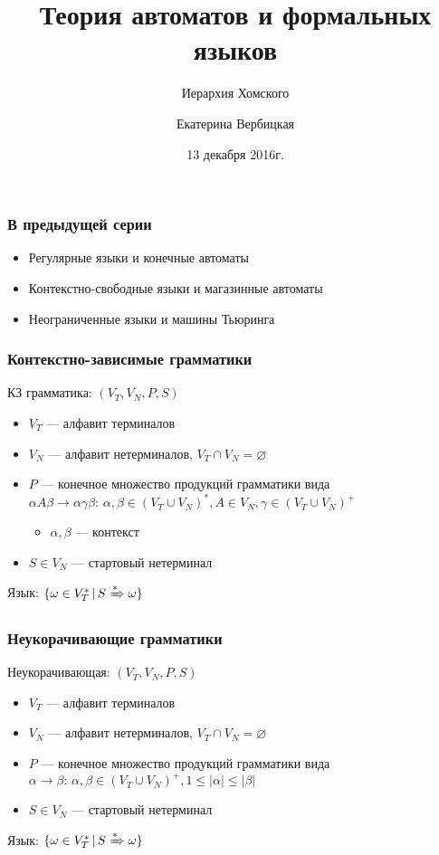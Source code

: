 \documentclass{beamer}
\title[]{Теория автоматов и формальных языков}
\subtitle[]{Иерархия Хомского}
\institute[]{
Санкт-Петербургский государственный электротехнический университет <<ЛЭТИ>>\\
}
\author[]{Екатерина Вербицкая}
\date{13 декабря 2016г.}
\newcommand{\derive}[0]{\xRightarrow[]{*}}
\begin{document}
{
  \begin{frame}
    \titlepage
  \end{frame}
}

\begin{frame}[fragile]
  \transwipe[direction=90]
  \frametitle{В предыдущей серии}
  \begin{itemize}
    \item Регулярные языки и конечные автоматы
    \item Контекстно-свободные языки и магазинные автоматы
    \item Неограниченные языки и машины Тьюринга
  \end{itemize}
\end{frame}

\begin{frame}[fragile]
  \transwipe[direction=90]
  \frametitle{Контекстно-зависимые грамматики}
  КЗ грамматика: $(V_T, V_N, P, S)$
  
  \begin{itemize}
    \item $V_T$ --- алфавит терминалов
    \item $V_N$ --- алфавит нетерминалов, $V_T \cap V_N = \varnothing$
    \item $P$ --- конечное множество продукций грамматики вида $\alpha A \beta \rightarrow \alpha \gamma \beta: \, \alpha, \beta \in (V_T \cup V_N)^*, A \in V_N, \gamma \in (V_T \cup V_N)^+$
    \begin{itemize}
      \item $\alpha, \beta$ --- контекст
    \end{itemize}    
    \item $S \in V_N$ --- стартовый нетерминал
  \end{itemize} 
  
  Язык: $\{ \omega \in V_T^* \, | \, S \derive \omega\}$ 
\end{frame}


\begin{frame}[fragile]
  \transwipe[direction=90]
  \frametitle{Неукорачивающие грамматики}
  Неукорачивающая: $(V_T, V_N, P, S)$
  
  \begin{itemize}
    \item $V_T$ --- алфавит терминалов
    \item $V_N$ --- алфавит нетерминалов, $V_T \cap V_N = \varnothing$
    \item $P$ --- конечное множество продукций грамматики вида $\alpha \rightarrow \beta: \, \alpha, \beta \in (V_T \cup V_N)^+, 1 \leq |\alpha| \leq |\beta|$   
    \item $S \in V_N$ --- стартовый нетерминал
  \end{itemize}
  
  Язык: $\{ \omega \in V_T^* \, | \, S \derive \omega\}$   
\end{frame}
\end{document}
